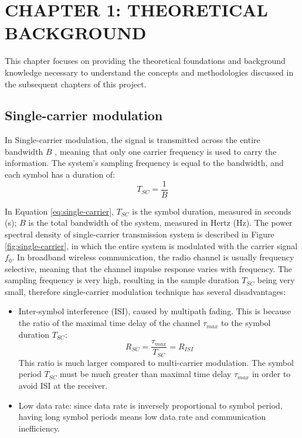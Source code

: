 \section*{CHAPTER 1: THEORETICAL BACKGROUND}
\setcounter{section}{1}
\setcounter{subsection}{0}
\setcounter{figure}{0}
\setcounter{table}{0}

This chapter focuses on providing the theoretical foundations and background knowledge necessary to understand the concepts and methodologies discussed in the subsequent chapters of this project.

\subsection{Single-carrier modulation}
In Single-carrier modulation, the signal is transmitted across the entire bandwidth $B$ \cite{OFDM2006}, meaning that only one carrier frequency is used to carry the information. The system's sampling frequency is equal to the bandwidth, and each symbol has a duration of:
\begin{equation}
    T_{SC} = \frac{1}{B}
    \label{eq:single-carrier}
\end{equation}

In Equation \ref{eq:single-carrier}, $T_{SC}$ is the symbol duration, measured in seconds (s); $B$ is the total bandwidth of the system, measured in Hertz (Hz). The power spectral density of single-carrier transmission system is described in Figure \ref{fig:single-carrier}, in which the entire system is modulated with the carrier signal $f_0$. In broadband wireless communication, the radio channel is usually frequency selective, meaning that the channel impulse response varies with frequency. The sampling frequency is very high, resulting in the sample duration $T_{SC}$ being very small, therefore single-carrier modulation technique has several disadvantages:

\begin{itemize}
    \item Inter-symbol interference (ISI), caused by multipath fading. This is because the ratio of the maximal time delay of the channel $\tau_{max}$ to the symbol duration $T_{SC}$:
    \begin{equation}
        R_{SC} = \frac{\tau_{max}}{T_{SC}} = R_{ISI}
    \end{equation}
    This ratio is much larger compared to multi-carrier modulation. The symbol period $T_{SC}$ must be much greater than maximal time delay $\tau_{max}$ in order to avoid ISI at the receiver.
    \item Low data rate: since data rate is inversely proportional to symbol period, having long symbol periods means low data rate and communication inefficiency.
\end{itemize}

